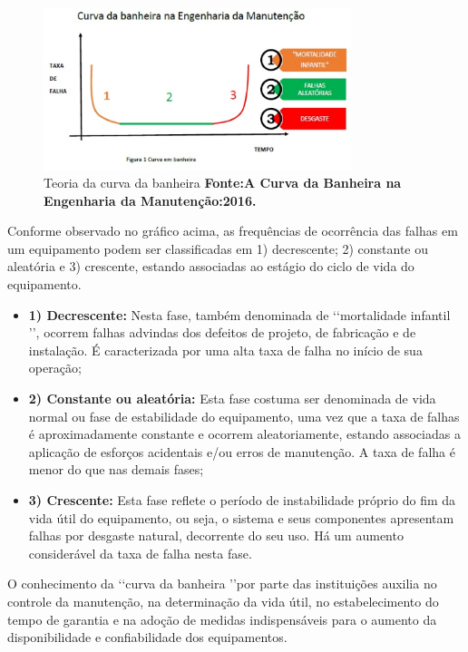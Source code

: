 \graphicspath{{figuras/}}
\begin{figure}[H]
\centering
\includegraphics[width=0.8\textwidth]{curva_da_banheira.eps}
\caption{Teoria da curva da banheira \textbf{Fonte:A Curva da Banheira na Engenharia da Manutenção:2016.}}
\label{Curva da banheira}
\end{figure}

Conforme observado no gráfico acima, as frequências de ocorrência das falhas em um equipamento podem ser classificadas em 1) decrescente; 2) constante ou aleatória e 3) crescente, estando associadas ao estágio do ciclo de vida do equipamento.

\begin{itemize}
	\item \textbf{1) Decrescente:} Nesta fase, também denominada de \lq\lq mortalidade infantil \rq\rq, ocorrem falhas advindas dos defeitos de projeto, de fabricação e de instalação. É caracterizada por uma alta taxa de falha no início de sua operação;
	\item \textbf{2) Constante ou aleatória:} Esta fase costuma ser denominada de vida normal ou fase de estabilidade do equipamento, uma vez que a taxa de falhas é aproximadamente constante e ocorrem aleatoriamente, estando associadas a aplicação de esforços acidentais e/ou erros de manutenção. A taxa de falha é menor do que nas demais fases;
	\item \textbf{3) Crescente:} Esta fase reflete o período de instabilidade próprio do fim da vida útil do equipamento, ou seja, o sistema e seus componentes apresentam falhas por desgaste natural, decorrente do seu uso. Há um aumento considerável da taxa de falha nesta fase.  
\end{itemize} 

O conhecimento da \lq\lq curva da banheira \rq\rq por parte das instituições auxilia no controle da manutenção, na determinação da vida útil, no estabelecimento do tempo de garantia e na adoção de medidas indispensáveis para o aumento da disponibilidade e confiabilidade dos equipamentos.

